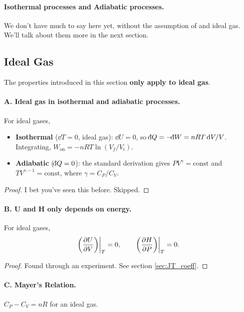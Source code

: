\paragraph{Isothermal processes and Adiabatic processes.}
We don't have much to say here yet, without the assumption of and ideal gas. We'll talk about them more in the next section. 


\subsection{Ideal Gas}
The properties introduced in this section \textbf{only apply to ideal gas}. 
\paragraph{A. Ideal gas in isothermal and adiabatic processes.}
\begin{theorem}
    For ideal gases,
    \begin{itemize}
        \item \textbf{Isothermal} ($\dd T = 0$, ideal gas): $\dd U = 0$, so $\dbar Q = -\dbar W = nRT\,\dd V/V$. Integrating, $W_{\text{on}} = -nRT\ln(V_f/V_i)$.
        \item \textbf{Adiabatic} ($\dbar Q = 0$): the standard derivation gives $PV^\gamma = \mathrm{const}$ and $TV^{\gamma-1} = \mathrm{const}$, where $\gamma = C_P/C_V$.
    \end{itemize}   
\end{theorem}
\begin{proof}
    I bet you've seen this before. Skipped.
\end{proof}

\paragraph{B. U and H only depends on energy.}
\begin{theorem}
    For ideal gases, 
    \[
        \left.\left(\dfrac{\partial U}{\partial V}\right)\right|_T = 0, \qquad \left.\left(\dfrac{\partial H}{\partial P}\right)\right|_T = 0.
    \]
\end{theorem}
\begin{proof}
    Found through an experiment. See section \ref{sec:JT_coeff}. 
\end{proof}

\paragraph{C. Mayer's Relation.} 
\begin{theorem}
    $C_P - C_V = nR$ for an ideal gas. 
\end{theorem}

